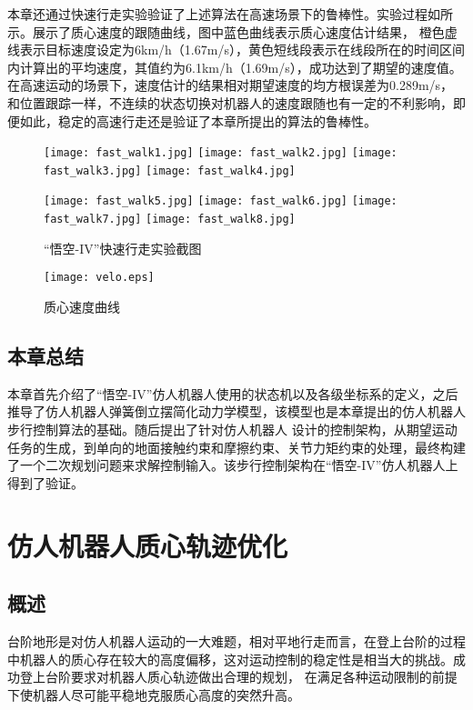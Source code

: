本章还通过快速行走实验验证了上述算法在高速场景下的鲁棒性。实验过程如所示。展示了质心速度的跟随曲线，图中蓝色曲线表示质心速度估计结果，
橙色虚线表示目标速度设定为6km/h（1.67m/s），黄色短线段表示在线段所在的时间区间内计算出的平均速度，其值约为6.1km/h（1.69m/s），成功达到了期望的速度值。
在高速运动的场景下，速度估计的结果相对期望速度的均方根误差为0.289m/s，和位置跟踪一样，不连续的状态切换对机器人的速度跟随也有一定的不利影响，即便如此，稳定的高速行走还是验证了本章所提出的算法的鲁棒性。
\begin{figure}[htbp]
    \centering
    \texttt{[image: fast\_walk1.jpg]}
    \texttt{[image: fast\_walk2.jpg]}
    \texttt{[image: fast\_walk3.jpg]}
    \texttt{[image: fast\_walk4.jpg]}

    \texttt{[image: fast\_walk5.jpg]}
    \texttt{[image: fast\_walk6.jpg]}
    \texttt{[image: fast\_walk7.jpg]}
    \texttt{[image: fast\_walk8.jpg]}   
    \caption{\label{fig:fast_walk}“悟空-IV”快速行走实验截图}
\end{figure}
\begin{figure}[htbp]
    \centering
    \texttt{[image: velo.eps]}
    \caption{\label{fig:com_vel_track}质心速度曲线}
\end{figure}
\section{本章总结}
本章首先介绍了“悟空-IV”仿人机器人使用的状态机以及各级坐标系的定义，之后推导了仿人机器人弹簧倒立摆简化动力学模型，该模型也是本章提出的仿人机器人步行控制算法的基础。随后提出了针对仿人机器人
设计的控制架构，从期望运动任务的生成，到单向的地面接触约束和摩擦约束、关节力矩约束的处理，最终构建了一个二次规划问题来求解控制输入。该步行控制架构在“悟空-IV”仿人机器人上得到了验证。
\chapter{仿人机器人质心轨迹优化}
\section{概述}
台阶地形是对仿人机器人运动的一大难题，相对平地行走而言，在登上台阶的过程中机器人的质心存在较大的高度偏移，这对运动控制的稳定性是相当大的挑战。成功登上台阶要求对机器人质心轨迹做出合理的规划，
在满足各种运动限制的前提下使机器人尽可能平稳地克服质心高度的突然升高。

